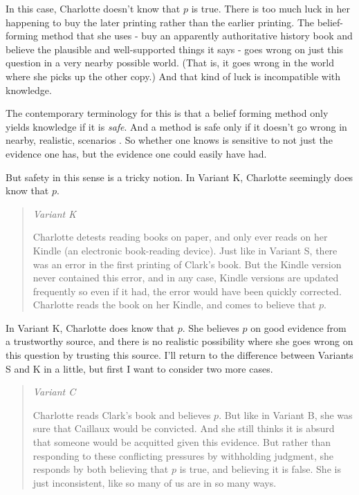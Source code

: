 \documentclass[11pt,]{book}
\begin{document}
In this case, Charlotte doesn't know that \(p\) is true. There is too much luck in her happening to buy the later printing rather than the earlier printing. The belief-forming method that she uses - buy an apparently authoritative history book and believe the plausible and well-supported things it says - goes wrong on just this question in a very nearby possible world. (That is, it goes wrong in the world where she picks up the other copy.) And that kind of luck is incompatible with knowledge.

The contemporary terminology for this is that a belief forming method only yields knowledge if it is \emph{safe}. And a method is safe only if it doesn't go wrong in nearby, realistic, scenarios \citep{Williamson2000}. So whether one knows is sensitive to not just the evidence one has, but the evidence one could easily have had.

But safety in this sense is a tricky notion. In Variant K, Charlotte seemingly does know that \(p\).

\begin{quote}
\emph{Variant K}

Charlotte detests reading books on paper, and only ever reads on her Kindle (an electronic book-reading device). Just like in Variant S, there was an error in the first printing of Clark's book. But the Kindle version never contained this error, and in any case, Kindle versions are updated frequently so even if it had, the error would have been quickly corrected. Charlotte reads the book on her Kindle, and comes to believe that \(p\).
\end{quote}

In Variant K, Charlotte does know that \(p\). She believes \(p\) on good evidence from a trustworthy source, and there is no realistic possibility where she goes wrong on this question by trusting this source. I'll return to the difference between Variants S and K in a little, but first I want to consider two more cases.

\begin{quote}
\emph{Variant C}

Charlotte reads Clark's book and believes \(p\). But like in Variant B, she was sure that Caillaux would be convicted. And she still thinks it is absurd that someone would be acquitted given this evidence. But rather than responding to these conflicting pressures by withholding judgment, she responds by both believing that \(p\) is true, and believing it is false. She is just inconsistent, like so many of us are in so many ways.
\end{quote}
\end{document}

